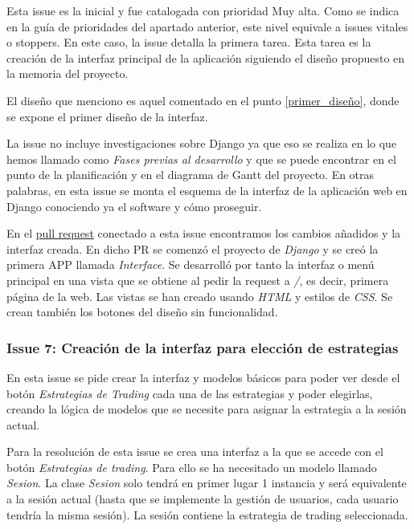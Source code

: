 Esta issue es la inicial y fue catalogada con prioridad Muy alta. Como se indica en la guía de prioridades del apartado anterior, este nivel equivale a issues vitales o stoppers. En este caso, la issue detalla la primera tarea. Esta tarea es la creación de la interfaz principal de la aplicación siguiendo el diseño propuesto en la memoria del proyecto. \newline

El diseño que menciono es aquel comentado en el punto \ref{primer_diseño}, donde se expone el primer diseño de la interfaz. \newline

La issue no incluye investigaciones sobre Django ya que eso se realiza en lo que hemos llamado como\textit{ Fases previas al desarrollo} y que se puede encontrar en el punto de la planificación y en el diagrama de Gantt del proyecto. En otras palabras, en esta issue se monta el esquema de la interfaz de la aplicación web en Django conociendo ya el software y cómo proseguir. \newline

En el \color{blue}\href{https://github.com/mcarmona99/TFG/pull/6}{pull request} \color{black}conectado a esta issue encontramos los cambios añadidos y la interfaz creada. En dicho PR se comenzó el proyecto de \textit{Django} y se creó la primera APP llamada \textit{Interface}. Se desarrolló por tanto la interfaz o menú principal en una vista que se obtiene al pedir la request a \textit{/}, es decir, primera página de la web. Las vistas se han creado usando \textit{HTML} y estilos de \textit{CSS}. Se crean también los botones del diseño sin funcionalidad. \newline

\subsubsection{Issue 7: Creación de la interfaz para elección de estrategias}

En esta issue se pide crear la interfaz y modelos básicos para poder ver desde el botón \textit{Estrategias de Trading} cada una de las estrategias y poder elegirlas, creando la lógica de modelos que se necesite para asignar la estrategia a la sesión actual. \newline

Para la resolución de esta issue se crea una interfaz a la que se accede con el botón \textit{Estrategias de trading}. Para ello se ha necesitado un modelo llamado \textit{Sesion}. La clase \textit{Sesion} solo tendrá en primer lugar 1 instancia y será equivalente a la sesión actual (hasta que se implemente la gestión de usuarios, cada usuario tendría la misma sesión). La sesión contiene la estrategia de trading seleccionada. \newline

